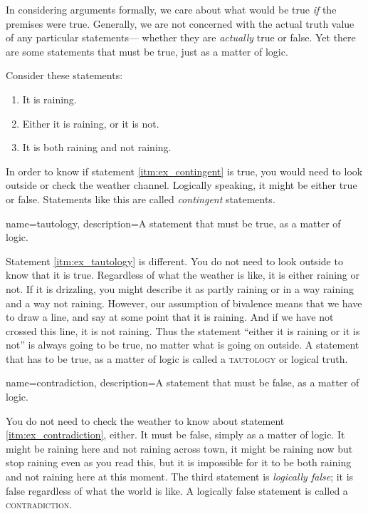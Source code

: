 In considering arguments formally, we care about what would be true \emph{if} the premises were true. Generally, we are not concerned with the actual truth value of any particular statements--- whether they are \emph{actually} true or false. Yet there are some statements that must be true, just as a matter of logic.

Consider these statements:
\begin{enumerate}
\item \label{itm:ex_contingent} It is raining.
\item \label{itm:ex_tautology} Either it is raining, or it is not.
\item \label{itm:ex_contradiction} It is both raining and not raining.
\end{enumerate}
In order to know if statement \ref{itm:ex_contingent} is true, you would need to look outside or check the weather channel. Logically speaking, it might be either true or false. Statements like this are called \emph{contingent} statements.


{
name=tautology,
description={A statement that must be true, as a matter of logic.}
}

Statement \ref{itm:ex_tautology} is different. You do not need to look outside to know that it is true. Regardless of what the weather is like, it is either raining or not. If it is drizzling, you might describe it as partly raining or in a way raining and a way not raining. However, our assumption of bivalence means that we have to draw a line, and say at some point that it is raining. And if we have not crossed this line, it is not raining. Thus the statement ``either it is raining or it is not'' is always going to be true, no matter what is going on outside. A statement that has to be true, as a matter of logic is called a \textsc{\gls{tautology}} \label{def:tautology} or logical truth.

{
name=contradiction,
description={A statement that must be false, as a matter of logic.}
}

You do not need to check the weather to know about statement \ref{itm:ex_contradiction}, either. It must be false, simply as a matter of logic. It might be raining here and not raining across town, it might be raining now but stop raining even as you read this, but it is impossible for it to be both raining and not raining here at this moment. The third statement is \emph{logically false}; it is false regardless of what the world is like. A logically false statement is called a \textsc{\gls{contradiction}}. \label{def:contradiction}

